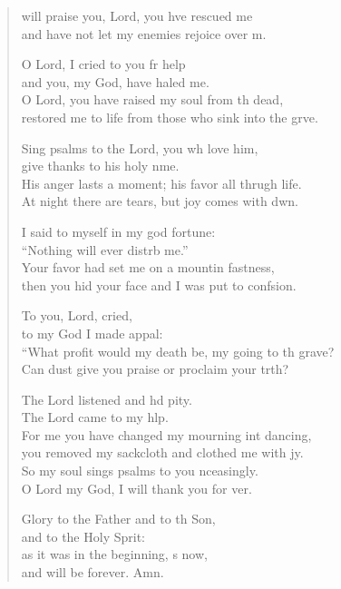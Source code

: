 \settowidth{\versewidth}{“What profit would my death be, my going to the grave? *}
\begin{verse}%
  \begin{patverse}
 will praise you, Lord, you hve rescued me\Med\\
and have not let my enemies rejoice over m.

O Lord, I cried to you fr help\Med\\
and you, my God, have haled me.\\
O Lord, you have raised my soul from th dead,\Med\\
restored me to life from those who sink into the grve.

Sing psalms to the Lord, you wh love him,\Med\\
give thanks to his holy nme.\\
His anger lasts a moment; his favor all thrugh life.\Med\\
At night there are tears, but joy comes with dwn.

I said to myself in my god fortune:\Med\\
“Nothing will ever distrb me.”\\
Your favor had set me on a mountin fastness,\Med\\
then you hid your face and I was put to confsion.

To you, Lord,  cried,\Med\\
to my God I made appal:\\
“What profit would my death be, my going to th grave?\Med\\
Can dust give you praise or proclaim your trth?

The Lord listened and hd pity.\Med\\
The Lord came to my hlp.\\
For me you have changed my mourning int dancing,\Med\\
you removed my sackcloth and clothed me with jy.\\
So my soul sings psalms to you nceasingly.\Med\\
O Lord my God, I will thank you for ver.

Glory to the Father and to th Son,\Med\\
and to the Holy Sp\pointup{\i}rit:\\
as it was in the beginning, \pointup{\i}s now,\Med\\
and will be forever. Amn. 
  \end{patverse}
\end{verse}
